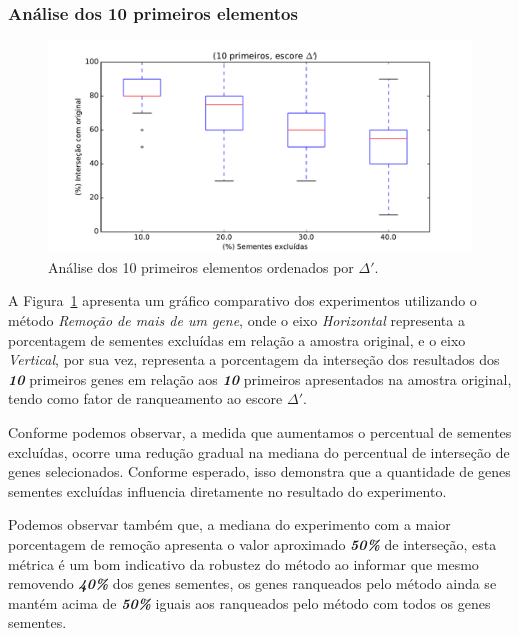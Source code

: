 \subsubsection{Análise dos 10 primeiros elementos}
%
\begin{figure}[ht!]
\centering
\includegraphics[width=\textwidth]{Images/analyses/fig_S_10_40.pdf}
\caption {Análise dos 10 primeiros elementos ordenados por $\Delta'$.
\label{fig_S_10_40}}
\end{figure}
%

%
A Figura~\ref{fig_S_10_40} apresenta um gráfico comparativo dos experimentos utilizando o método \textit{Remoção de mais de um gene}, onde o eixo \textsl{Horizontal} representa a porcentagem de sementes excluídas em relação a amostra original, e o eixo \textsl{Vertical}, por sua vez, representa a porcentagem da interseção dos resultados dos \textsl{\textbf{10}} primeiros genes em relação aos \textsl{\textbf{10}} primeiros apresentados na amostra original, tendo como fator de ranqueamento ao escore $\Delta'$.
%

Conforme podemos observar, a medida que aumentamos o percentual de sementes excluídas, ocorre uma redução gradual na mediana do percentual de interseção de genes selecionados.
Conforme esperado, isso demonstra que a quantidade de genes sementes excluídas influencia diretamente no resultado do experimento.
%

%
Podemos observar também que, a mediana do experimento com a maior porcentagem de remoção apresenta o valor aproximado \textsl{\textbf{50\%}} de interseção, esta métrica é um bom indicativo da robustez do método ao informar que mesmo removendo \textsl{\textbf{40\%}} dos genes sementes, os genes ranqueados pelo método ainda se mantém acima de \textsl{\textbf{50\%}} iguais aos ranqueados pelo método com todos os genes sementes.

